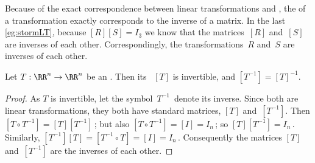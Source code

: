 Because of the exact correspondence between linear transformations and , the  of a transformation exactly corresponds to the inverse of a matrix.
In the last \cref{eg:stormLT}, because \([R][S]=I_3\) we know that the matrices~\([R]\) and~\([S]\) are inverses of each other. 
Correspondingly, the transformations~\(R\) and~\(S\) are inverses of each other.




\begin{theorem} \label{thm:invsm} 
Let \(T:\RR^n\to\RR^n\) be an  . 
Then its ~\([T]\) is invertible, and \([T^{-1}]=[T]^{-1}\). 
\end{theorem}
\begin{proof} 
As \(T\) is invertible,  let the symbol~\(T^{-1}\)~denote its inverse.
Since both are linear transformations, they both have standard matrices, \([T]\) and~\([T^{-1}]\).
Then \([T\circ T^{-1}]=[T][T^{-1}]\)\,; but also \([T\circ T^{-1}]=[I]=I_n\)\,; so \([T][T^{-1}]=I_n\)\,.
Similarly, \([T^{-1}][T]=[T^{-1}\circ T]=[I]=I_n\)\,.
Consequently the matrices \([T]\) and~\([T^{-1}]\) are the inverses of each other.
\end{proof}


